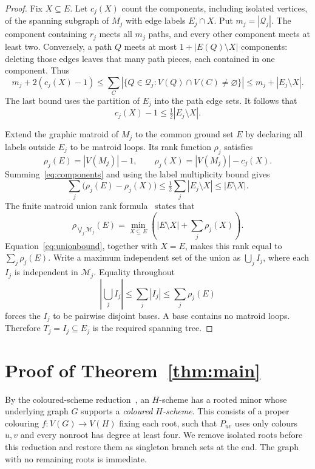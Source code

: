 \documentclass[11pt]{amsart}
\begin{document}
\begin{proof}
Fix $X\subseteq E$. Let $c_j(X)$ count the components, including isolated
vertices, of the spanning subgraph of $M_j$ with edge labels $E_j\cap X$.
Put $m_j=|\mathcal Q_j|$. The component containing $r_j$ meets all $m_j$
paths, and every other component meets at least two. Conversely, a path
$Q$ meets at most $1+|E(Q)\setminus X|$ components: deleting those edges
leaves that many path pieces, each contained in one component. Thus
\[
 m_j+2(c_j(X)-1)
 \leq \sum_C |\{Q\in\mathcal Q_j:V(Q)\cap V(C)\ne\varnothing\}|
 \leq m_j+|E_j\setminus X|.
\]
The last bound uses the partition of $E_j$ into the path
edge sets. It follows that
\begin{equation}\label{eq:components}
 c_j(X)-1\leq\tfrac12|E_j\setminus X|.
\end{equation}

Extend the graphic matroid of $M_j$ to the common ground set $E$ by
declaring all labels outside $E_j$ to be matroid loops. Its rank function
$\rho_j$ satisfies
\[
 \rho_j(E)=|V(M_j)|-1,
 \qquad \rho_j(X)=|V(M_j)|-c_j(X).
\]
Summing~\eqref{eq:components} and using the label multiplicity bound gives
\begin{equation}\label{eq:unionbound}
 \sum_j\bigl(\rho_j(E)-\rho_j(X)\bigr)
 \leq \tfrac12\sum_j|E_j\setminus X|
 \leq |E\setminus X|.
\end{equation}
The finite matroid union rank formula~\cite{Edmonds} states that
\[
 \rho_{\bigvee_j\mathcal M_j}(E)
 =\min_{X\subseteq E}\left(|E\setminus X|+\sum_j\rho_j(X)\right).
\]
Equation~\eqref{eq:unionbound}, together with $X=E$, makes this rank equal
to $\sum_j\rho_j(E)$. Write a maximum independent set of the union as
$\bigcup_j I_j$, where each $I_j$ is independent in $\mathcal M_j$.
Equality throughout
\[
 |\bigcup_j I_j|\leq\sum_j|I_j|\leq\sum_j\rho_j(E)
\]
forces the $I_j$ to be pairwise disjoint bases. A base contains no matroid
loops. Therefore $T_j=I_j\subseteq E_j$ is the required spanning tree.
\end{proof}

\section{Proof of Theorem~\ref{thm:main}}

By the coloured-scheme reduction~\cite[Lemma 3.3]{KPR}, an $H$-scheme
has a rooted minor whose underlying graph $G$ supports a \emph{coloured
$H$-scheme}. This consists of a proper colouring
$f:V(G)\longrightarrow V(H)$ fixing each root, such that $P_{uv}$ uses
only colours $u,v$ and every nonroot has degree at least four. We remove
isolated roots before this reduction and restore them as singleton branch
sets at the end. The graph with no remaining roots is immediate.
\end{document}
